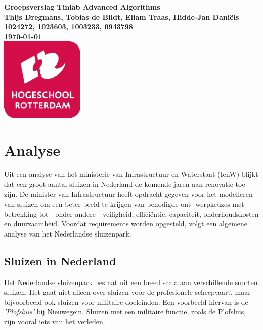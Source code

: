 \documentclass{article} %
\begin{document}
\sffamily
\begin{titlepage}
    \centering
    \vfill
    {\bfseries\Huge
    Groepsverslag Tinlab Advanced Algorithms \\
    \vskip2cm
    }
    {\bfseries\Large
    Thijs Dregmans, Tobias de Bildt, Eliam Traas, Hidde-Jan Daniëls\\
    }
    {
    \bfseries\normalsize
    1024272, 1023603, 1003233, 0943798\\
    \vskip1cm
    \today\\
    }    
    \vfill
    \includegraphics[width=4cm]{logohr.png} %
    \vfill
    \vfill
\end{titlepage}
\newpage

\tableofcontents
\newpage

\section{Analyse}
Uit een analyse van het ministerie van Infrastructuur en Waterstaat (IenW) blijkt dat een groot aantal sluizen in Nederland de komende jaren aan renovatie toe zijn. De minister van Infrastructuur heeft opdracht gegeven voor het modelleren van sluizen om een beter beeld te krijgen van benodigde ont- werpkeuzes met betrekking tot - onder andere - veiligheid, efficiëntie, capaciteit, onderhoudskosten en duurzaamheid. Voordat requirements worden opgesteld, volgt een algemene analyse van het Nederlandse sluizenpark. \par

\subsection{Sluizen in Nederland}
Het Nederlandse sluizenpark bestaat uit een breed scala aan verschillende soorten sluizen. Het gaat niet alleen over sluizen voor de profesionele scheepvaart, maar bijvoorbeeld ook sluizen voor militaire doeleinden. Een voorbeeld hiervan is de \textit{'Plofsluis'} bij Nieuwegein. \cite{rijkswaterstaatPlofsluis} Sluizen met een militaire functie, zoals de Plofsluis, zijn vooral iets van het verleden. \par
\end{document}
